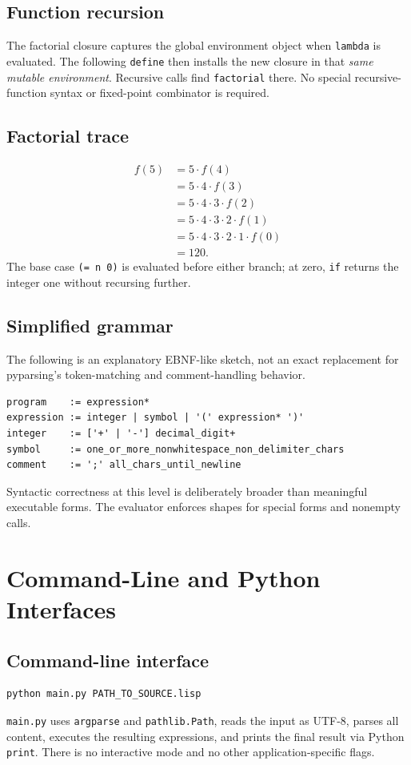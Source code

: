 \documentclass[11pt,a4paper,oneside]{report}
\begin{document}
\section{Function recursion}
The factorial closure captures the global environment object when \texttt{lambda} is evaluated. The following \texttt{define} then installs the new closure in that \emph{same mutable environment}. Recursive calls find \texttt{factorial} there. No special recursive-function syntax or fixed-point combinator is required.
\section{Factorial trace}
\begin{align*}
f(5)&=5\cdot f(4)\\
&=5\cdot4\cdot f(3)\\
&=5\cdot4\cdot3\cdot f(2)\\
&=5\cdot4\cdot3\cdot2\cdot f(1)\\
&=5\cdot4\cdot3\cdot2\cdot1\cdot f(0)\\
&=120.
\end{align*}
The base case \texttt{(= n 0)} is evaluated before either branch; at zero, \texttt{if} returns the integer one without recursing further.
\section{Simplified grammar}
The following is an explanatory EBNF-like sketch, not an exact replacement for pyparsing's token-matching and comment-handling behavior.
\begin{lstlisting}
program    := expression*
expression := integer | symbol | '(' expression* ')'
integer    := ['+' | '-'] decimal_digit+
symbol     := one_or_more_nonwhitespace_non_delimiter_chars
comment    := ';' all_chars_until_newline
\end{lstlisting}
Syntactic correctness at this level is deliberately broader than meaningful executable forms. The evaluator enforces shapes for special forms and nonempty calls.

\chapter{Command-Line and Python Interfaces}
\section{Command-line interface}
\begin{lstlisting}[language=bash]
python main.py PATH_TO_SOURCE.lisp
\end{lstlisting}
\texttt{main.py} uses \texttt{argparse} and \texttt{pathlib.Path}, reads the input as UTF-8, parses all content, executes the resulting expressions, and prints the final result via Python \texttt{print}. There is no interactive mode and no other application-specific flags.
\end{document}

